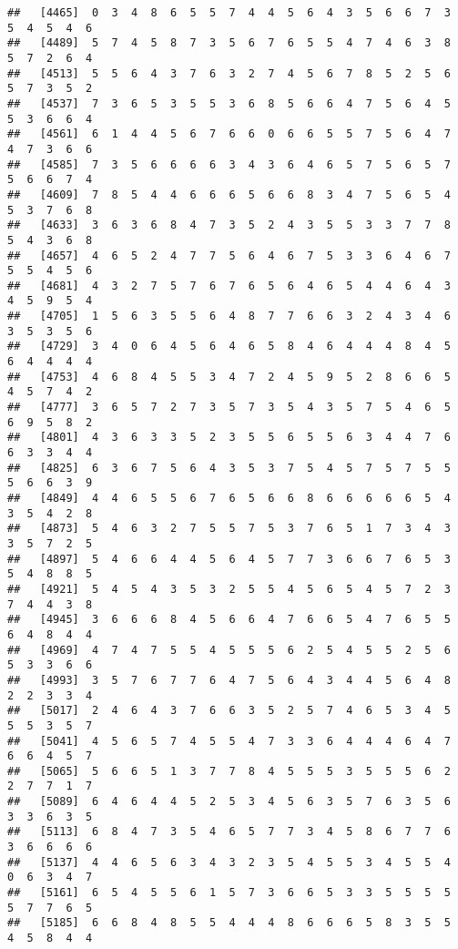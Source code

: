 \documentclass[
]{book}
\begin{document}
\begin{verbatim}
##   [4465]  0  3  4  8  6  5  5  7  4  4  5  6  4  3  5  6  6  7  3  5  4  5  4  6
##   [4489]  5  7  4  5  8  7  3  5  6  7  6  5  5  4  7  4  6  3  8  5  7  2  6  4
##   [4513]  5  5  6  4  3  7  6  3  2  7  4  5  6  7  8  5  2  5  6  5  7  3  5  2
##   [4537]  7  3  6  5  3  5  5  3  6  8  5  6  6  4  7  5  6  4  5  5  3  6  6  4
##   [4561]  6  1  4  4  5  6  7  6  6  0  6  6  5  5  7  5  6  4  7  4  7  3  6  6
##   [4585]  7  3  5  6  6  6  6  3  4  3  6  4  6  5  7  5  6  5  7  5  6  6  7  4
##   [4609]  7  8  5  4  4  6  6  6  5  6  6  8  3  4  7  5  6  5  4  5  3  7  6  8
##   [4633]  3  6  3  6  8  4  7  3  5  2  4  3  5  5  3  3  7  7  8  5  4  3  6  8
##   [4657]  4  6  5  2  4  7  7  5  6  4  6  7  5  3  3  6  4  6  7  5  5  4  5  6
##   [4681]  4  3  2  7  5  7  6  7  6  5  6  4  6  5  4  4  6  4  3  4  5  9  5  4
##   [4705]  1  5  6  3  5  5  6  4  8  7  7  6  6  3  2  4  3  4  6  3  5  3  5  6
##   [4729]  3  4  0  6  4  5  6  4  6  5  8  4  6  4  4  4  8  4  5  6  4  4  4  4
##   [4753]  4  6  8  4  5  5  3  4  7  2  4  5  9  5  2  8  6  6  5  4  5  7  4  2
##   [4777]  3  6  5  7  2  7  3  5  7  3  5  4  3  5  7  5  4  6  5  6  9  5  8  2
##   [4801]  4  3  6  3  3  5  2  3  5  5  6  5  5  6  3  4  4  7  6  6  3  3  4  4
##   [4825]  6  3  6  7  5  6  4  3  5  3  7  5  4  5  7  5  7  5  5  5  6  6  3  9
##   [4849]  4  4  6  5  5  6  7  6  5  6  6  8  6  6  6  6  6  5  4  3  5  4  2  8
##   [4873]  5  4  6  3  2  7  5  5  7  5  3  7  6  5  1  7  3  4  3  3  5  7  2  5
##   [4897]  5  4  6  6  4  4  5  6  4  5  7  7  3  6  6  7  6  5  3  5  4  8  8  5
##   [4921]  5  4  5  4  3  5  3  2  5  5  4  5  6  5  4  5  7  2  3  7  4  4  3  8
##   [4945]  3  6  6  6  8  4  5  6  6  4  7  6  6  5  4  7  6  5  5  6  4  8  4  4
##   [4969]  4  7  4  7  5  5  4  5  5  5  6  2  5  4  5  5  2  5  6  5  3  3  6  6
##   [4993]  3  5  7  6  7  7  6  4  7  5  6  4  3  4  4  5  6  4  8  2  2  3  3  4
##   [5017]  2  4  6  4  3  7  6  6  3  5  2  5  7  4  6  5  3  4  5  5  5  3  5  7
##   [5041]  4  5  6  5  7  4  5  5  4  7  3  3  6  4  4  4  6  4  7  6  6  4  5  7
##   [5065]  5  6  6  5  1  3  7  7  8  4  5  5  5  3  5  5  5  6  2  2  7  7  1  7
##   [5089]  6  4  6  4  4  5  2  5  3  4  5  6  3  5  7  6  3  5  6  3  3  6  3  5
##   [5113]  6  8  4  7  3  5  4  6  5  7  7  3  4  5  8  6  7  7  6  3  6  6  6  6
##   [5137]  4  4  6  5  6  3  4  3  2  3  5  4  5  5  3  4  5  5  4  0  6  3  4  7
##   [5161]  6  5  4  5  5  6  1  5  7  3  6  6  5  3  3  5  5  5  5  5  7  7  6  5
##   [5185]  6  6  8  4  8  5  5  4  4  4  8  6  6  6  5  8  3  5  5  4  5  8  4  4

\end{verbatim}
\end{document}
